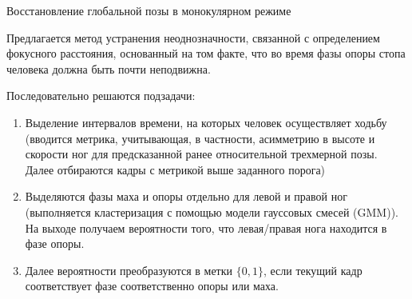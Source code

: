 \documentclass[9pt,aspectratio=169]{beamer}
\begin{document}
\begin{frame}{Восстановление глобальной позы в монокулярном режиме}

Предлагается метод устранения неоднозначности, связанной с
определением фокусного расстояния, основанный на том факте,
что во время фазы опоры стопа человека должна быть почти неподвижна.

Последовательно решаются подзадачи:

\begin{enumerate}
    \item Выделение интервалов времени, на которых человек осуществляет
    ходьбу (вводится метрика, учитывающая, в частности, асимметрию
    в высоте и скорости ног для предсказанной ранее относительной
    трехмерной позы. Далее отбираются кадры с метрикой выше заданного
    порога)
    \item Выделяются фазы маха и опоры отдельно для левой и правой
    ног (выполняется кластеризация с
    помощью модели гауссовых смесей (GMM){}). На выходе получаем вероятности
    того, что левая/правая нога находится в фазе опоры.
    \item Далее вероятности преобразуются в метки $\{0, 1\}$,
    если текущий кадр соответствует фазе соответственно опоры или маха.

\end{enumerate}

\end{frame}
\end{document}
